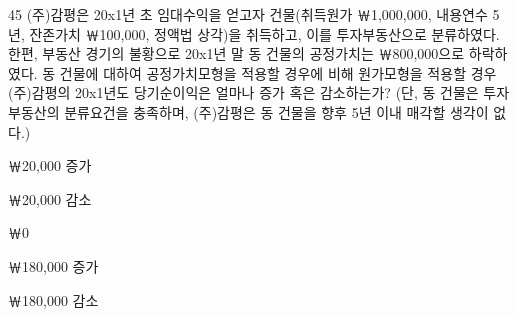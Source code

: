 \begin{question}{45}
(주)감평은 20x1년 초 임대수익을 얻고자 건물(취득원가 ￦1,000,000, 내용연수 5년, 잔존가치 ￦100,000, 정액법 상각)을 취득하고, 이를 투자부동산으로 분류하였다. 한편, 부동산 경기의 불황으로 20x1년 말 동 건물의 공정가치는 ￦800,000으로 하락하였다. 동 건물에 대하여 공정가치모형을 적용할 경우에 비해 원가모형을 적용할 경우 (주)감평의 20x1년도 당기순이익은 얼마나 증가 혹은 감소하는가? (단, 동 건물은 투자부동산의 분류요건을 충족하며, (주)감평은 동 건물을 향후 5년 이내 매각할 생각이 없다.)
\begin{choices}
  \item ￦20,000 증가
  \item ￦20,000 감소
  \item ￦0
  \item ￦180,000 증가
  \item ￦180,000 감소
\end{choices}
\end{question}
